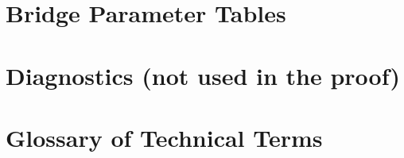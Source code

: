 \section{Bridge Parameter Tables}\label{app:paramtables}


\section{Diagnostics (not used in the proof)}\label{app:diagnostics}


\section{Glossary of Technical Terms}\label{app:glossary}

